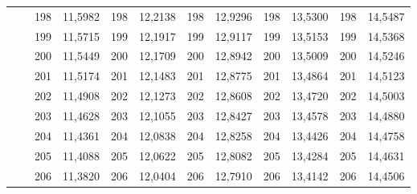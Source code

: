 \documentclass[a4paper,12pt]{article} %
\begin{document}
\begin{longtable}[c]{cccccccccc|c|c|}
	& \multicolumn{1}{c|}{} & \multicolumn{1}{c|}{198} & \multicolumn{1}{c|}{11,5982} & \multicolumn{1}{c|}{198} & \multicolumn{1}{c|}{12,2138} & \multicolumn{1}{c|}{198} & \multicolumn{1}{c|}{12,9296} & \multicolumn{1}{c|}{198} & 13,5300 & 198 & 14,5487 \\ \cline{3-12} 
	& \multicolumn{1}{c|}{} & \multicolumn{1}{c|}{199} & \multicolumn{1}{c|}{11,5715} & \multicolumn{1}{c|}{199} & \multicolumn{1}{c|}{12,1917} & \multicolumn{1}{c|}{199} & \multicolumn{1}{c|}{12,9117} & \multicolumn{1}{c|}{199} & 13,5153 & 199 & 14,5368 \\ \cline{3-12} 
	& \multicolumn{1}{c|}{} & \multicolumn{1}{c|}{200} & \multicolumn{1}{c|}{11,5449} & \multicolumn{1}{c|}{200} & \multicolumn{1}{c|}{12,1709} & \multicolumn{1}{c|}{200} & \multicolumn{1}{c|}{12,8942} & \multicolumn{1}{c|}{200} & 13,5009 & 200 & 14,5246 \\ \cline{3-12} 
	& \multicolumn{1}{c|}{} & \multicolumn{1}{c|}{201} & \multicolumn{1}{c|}{11,5174} & \multicolumn{1}{c|}{201} & \multicolumn{1}{c|}{12,1483} & \multicolumn{1}{c|}{201} & \multicolumn{1}{c|}{12,8775} & \multicolumn{1}{c|}{201} & 13,4864 & 201 & 14,5123 \\ \cline{3-12} 
	& \multicolumn{1}{c|}{} & \multicolumn{1}{c|}{202} & \multicolumn{1}{c|}{11,4908} & \multicolumn{1}{c|}{202} & \multicolumn{1}{c|}{12,1273} & \multicolumn{1}{c|}{202} & \multicolumn{1}{c|}{12,8608} & \multicolumn{1}{c|}{202} & 13,4720 & 202 & 14,5003 \\ \cline{3-12} 
	& \multicolumn{1}{c|}{} & \multicolumn{1}{c|}{203} & \multicolumn{1}{c|}{11,4628} & \multicolumn{1}{c|}{203} & \multicolumn{1}{c|}{12,1055} & \multicolumn{1}{c|}{203} & \multicolumn{1}{c|}{12,8427} & \multicolumn{1}{c|}{203} & 13,4578 & 203 & 14,4880 \\ \cline{3-12} 
	& \multicolumn{1}{c|}{} & \multicolumn{1}{c|}{204} & \multicolumn{1}{c|}{11,4361} & \multicolumn{1}{c|}{204} & \multicolumn{1}{c|}{12,0838} & \multicolumn{1}{c|}{204} & \multicolumn{1}{c|}{12,8258} & \multicolumn{1}{c|}{204} & 13,4426 & 204 & 14,4758 \\ \cline{3-12} 
	& \multicolumn{1}{c|}{} & \multicolumn{1}{c|}{205} & \multicolumn{1}{c|}{11,4088} & \multicolumn{1}{c|}{205} & \multicolumn{1}{c|}{12,0622} & \multicolumn{1}{c|}{205} & \multicolumn{1}{c|}{12,8082} & \multicolumn{1}{c|}{205} & 13,4284 & 205 & 14,4631 \\ \cline{3-12} 
	& \multicolumn{1}{c|}{} & \multicolumn{1}{c|}{206} & \multicolumn{1}{c|}{11,3820} & \multicolumn{1}{c|}{206} & \multicolumn{1}{c|}{12,0404} & \multicolumn{1}{c|}{206} & \multicolumn{1}{c|}{12,7910} & \multicolumn{1}{c|}{206} & 13,4142 & 206 & 14,4506 \\ \cline{3-12} 

\end{longtable}
\end{document}
